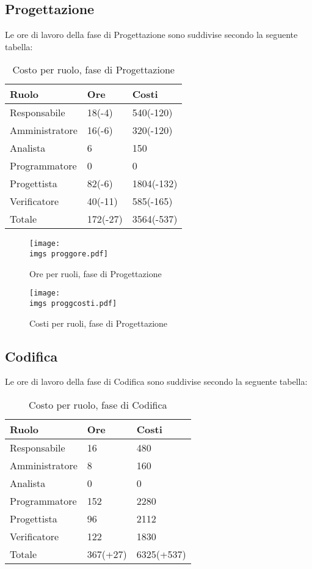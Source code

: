 {\subsection{Progettazione}{
	Le ore di lavoro della fase di Progettazione sono suddivise secondo la seguente tabella:
	\begin{table}[H]
	 	\centering
	  \begin{tabular}{p{}p{}
	  		  				p{}}
		  \toprule Ruolo & Ore  & Costi \\
		  \midrule
		  Responsabile & 18(-4)  & 540(-120) \\
		  Amministratore & 16(-6)  & 320(-120) \\
		  Analista & 6   & 150 \\
		  Programmatore & 0   & 0 \\
		  Progettista & 82(-6)  & 1804(-132) \\
		  Verificatore & 40(-11)  & 585(-165) \\
		  Totale & 172(-27)  & 3564(-537) \\
		  \bottomrule
	  \end{tabular}
	 	\label{tab:costoprogettazione}
		\caption{Costo per ruolo, fase di Progettazione}
	\end{table}
	
	\begin{figure}[H]
		\centering
		\texttt{[image: \\imgs proggore.pdf]}
		\label{fig:oreprogettazione}
		\caption{Ore per ruoli, fase di Progettazione}
	\end{figure}
	\begin{figure}[H]
		\centering
		\texttt{[image: \\imgs proggcosti.pdf]}
		\label{fig:costoprogettazione}
		\caption{Costi per ruoli, fase di Progettazione}
	\end{figure}
}
\subsection{Codifica}{
	Le ore di lavoro della fase di Codifica sono suddivise secondo la seguente tabella:
	\begin{table}[H]
		 \centering
		\begin{tabular}{p{}p{}
			  		  				p{}}
			  \toprule Ruolo & Ore  & Costi \\
			  \midrule
			  Responsabile & 16  & 480 \\
			  Amministratore & 8   & 160 \\
			  Analista & 0   & 0 \\
			  Programmatore & 152  & 2280 \\
			  Progettista & 96  & 2112 \\
			  Verificatore & 122  & 1830 \\
			  Totale & 367(+27)  & 6325(+537) \\
			  \bottomrule
		  \end{tabular}
		 \label{tab:costocodifica}
		 \caption{Costo per ruolo, fase di Codifica}
	\end{table}
	
}}
